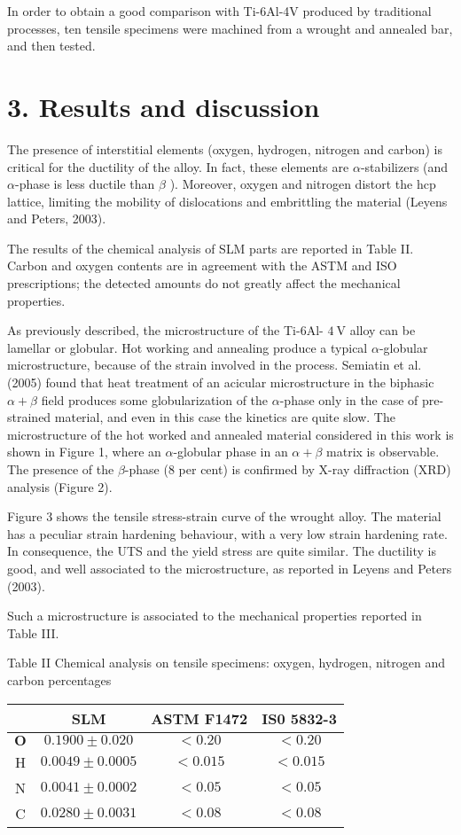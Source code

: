\documentclass[10pt]{article}
\begin{document}
In order to obtain a good comparison with Ti-6Al-4V produced by traditional processes, ten tensile specimens were machined from a wrought and annealed bar, and then tested.

\section*{3. Results and discussion}
The presence of interstitial elements (oxygen, hydrogen, nitrogen and carbon) is critical for the ductility of the alloy. In fact, these elements are $\alpha$-stabilizers (and $\alpha$-phase is less ductile than $\beta$ ). Moreover, oxygen and nitrogen distort the hcp lattice, limiting the mobility of dislocations and embrittling the material (Leyens and Peters, 2003).

The results of the chemical analysis of SLM parts are reported in Table II. Carbon and oxygen contents are in agreement with the ASTM and ISO prescriptions; the detected amounts do not greatly affect the mechanical properties.

As previously described, the microstructure of the Ti-6Al- $4 \mathrm{~V}$ alloy can be lamellar or globular. Hot working and annealing produce a typical $\alpha$-globular microstructure, because of the strain involved in the process. Semiatin et al. (2005) found that heat treatment of an acicular microstructure in the biphasic $\alpha+\beta$ field produces some globularization of the $\alpha$-phase only in the case of pre-strained material, and even in this case the kinetics are quite slow. The microstructure of the hot worked and annealed material considered in this work is shown in Figure 1, where an $\alpha$-globular phase in an $\alpha+\beta$ matrix is observable. The presence of the $\beta$-phase (8 per cent) is confirmed by X-ray diffraction (XRD) analysis (Figure 2).

Figure 3 shows the tensile stress-strain curve of the wrought alloy. The material has a peculiar strain hardening behaviour, with a very low strain hardening rate. In consequence, the UTS and the yield stress are quite similar. The ductility is good, and well associated to the microstructure, as reported in Leyens and Peters (2003).

Such a microstructure is associated to the mechanical properties reported in Table III.

Table II Chemical analysis on tensile specimens: oxygen, hydrogen, nitrogen and carbon percentages

\begin{center}
\begin{tabular}{cccc}
\hline
 & \multicolumn{1}{c}{SLM} & ASTM F1472 & IS0 5832-3 \\
\hline
$\mathbf{O}$ & $0.1900 \pm 0.020$ & $<0.20$ & $<0.20$ \\
H & $0.0049 \pm 0.0005$ & $<0.015$ & $<0.015$ \\
N & $0.0041 \pm 0.0002$ & $<0.05$ & $<0.05$ \\
C & $0.0280 \pm 0.0031$ & $<0.08$ & $<0.08$ \\
\end{tabular}
\end{center}
\end{document}
